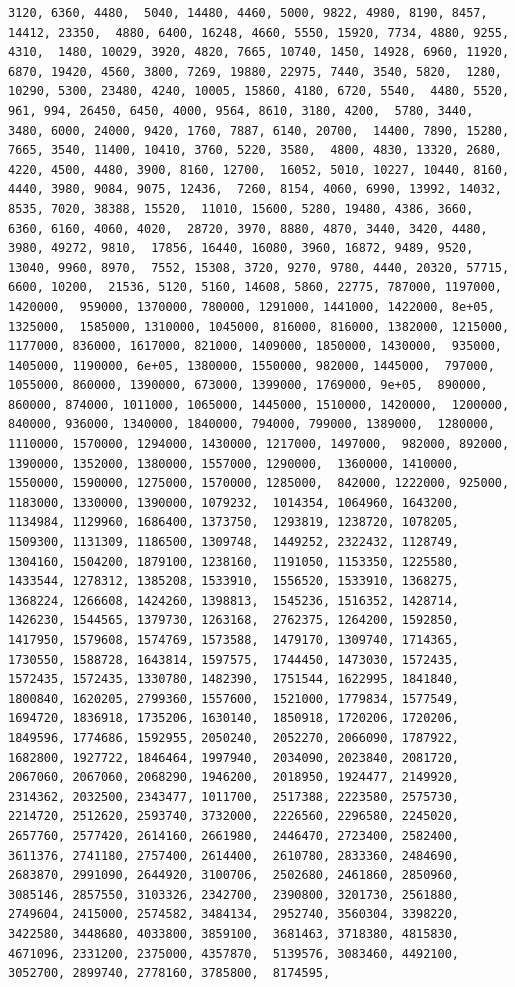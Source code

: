 \documentclass[
]{article}
\begin{document}
\begin{verbatim}
3120, 6360, 4480,  5040, 14480, 4460, 5000, 9822, 4980, 8190, 8457, 14412, 23350,  4880, 6400, 16248, 4660, 5550, 15920, 7734, 4880, 9255, 4310,  1480, 10029, 3920, 4820, 7665, 10740, 1450, 14928, 6960, 11920,  6870, 19420, 4560, 3800, 7269, 19880, 22975, 7440, 3540, 5820,  1280, 10290, 5300, 23480, 4240, 10005, 15860, 4180, 6720, 5540,  4480, 5520, 961, 994, 26450, 6450, 4000, 9564, 8610, 3180, 4200,  5780, 3440, 3480, 6000, 24000, 9420, 1760, 7887, 6140, 20700,  14400, 7890, 15280, 7665, 3540, 11400, 10410, 3760, 5220, 3580,  4800, 4830, 13320, 2680, 4220, 4500, 4480, 3900, 8160, 12700,  16052, 5010, 10227, 10440, 8160, 4440, 3980, 9084, 9075, 12436,  7260, 8154, 4060, 6990, 13992, 14032, 8535, 7020, 38388, 15520,  11010, 15600, 5280, 19480, 4386, 3660, 6360, 6160, 4060, 4020,  28720, 3970, 8880, 4870, 3440, 3420, 4480, 3980, 49272, 9810,  17856, 16440, 16080, 3960, 16872, 9489, 9520, 13040, 9960, 8970,  7552, 15308, 3720, 9270, 9780, 4440, 20320, 57715, 6600, 10200,  21536, 5120, 5160, 14608, 5860, 22775, 787000, 1197000, 1420000,  959000, 1370000, 780000, 1291000, 1441000, 1422000, 8e+05, 1325000,  1585000, 1310000, 1045000, 816000, 816000, 1382000, 1215000,  1177000, 836000, 1617000, 821000, 1409000, 1850000, 1430000,  935000, 1405000, 1190000, 6e+05, 1380000, 1550000, 982000, 1445000,  797000, 1055000, 860000, 1390000, 673000, 1399000, 1769000, 9e+05,  890000, 860000, 874000, 1011000, 1065000, 1445000, 1510000, 1420000,  1200000, 840000, 936000, 1340000, 1840000, 794000, 799000, 1389000,  1280000, 1110000, 1570000, 1294000, 1430000, 1217000, 1497000,  982000, 892000, 1390000, 1352000, 1380000, 1557000, 1290000,  1360000, 1410000, 1550000, 1590000, 1275000, 1570000, 1285000,  842000, 1222000, 925000, 1183000, 1330000, 1390000, 1079232,  1014354, 1064960, 1643200, 1134984, 1129960, 1686400, 1373750,  1293819, 1238720, 1078205, 1509300, 1131309, 1186500, 1309748,  1449252, 2322432, 1128749, 1304160, 1504200, 1879100, 1238160,  1191050, 1153350, 1225580, 1433544, 1278312, 1385208, 1533910,  1556520, 1533910, 1368275, 1368224, 1266608, 1424260, 1398813,  1545236, 1516352, 1428714, 1426230, 1544565, 1379730, 1263168,  2762375, 1264200, 1592850, 1417950, 1579608, 1574769, 1573588,  1479170, 1309740, 1714365, 1730550, 1588728, 1643814, 1597575,  1744450, 1473030, 1572435, 1572435, 1572435, 1330780, 1482390,  1751544, 1622995, 1841840, 1800840, 1620205, 2799360, 1557600,  1521000, 1779834, 1577549, 1694720, 1836918, 1735206, 1630140,  1850918, 1720206, 1720206, 1849596, 1774686, 1592955, 2050240,  2052270, 2066090, 1787922, 1682800, 1927722, 1846464, 1997940,  2034090, 2023840, 2081720, 2067060, 2067060, 2068290, 1946200,  2018950, 1924477, 2149920, 2314362, 2032500, 2343477, 1011700,  2517388, 2223580, 2575730, 2214720, 2512620, 2593740, 3732000,  2226560, 2296580, 2245020, 2657760, 2577420, 2614160, 2661980,  2446470, 2723400, 2582400, 3611376, 2741180, 2757400, 2614400,  2610780, 2833360, 2484690, 2683870, 2991090, 2644920, 3100706,  2502680, 2461860, 2850960, 3085146, 2857550, 3103326, 2342700,  2390800, 3201730, 2561880, 2749604, 2415000, 2574582, 3484134,  2952740, 3560304, 3398220, 3422580, 3448680, 4033800, 3859100,  3681463, 3718380, 4815830, 4671096, 2331200, 2375000, 4357870,  5139576, 3083460, 4492100, 3052700, 2899740, 2778160, 3785800,  8174595, 
\end{verbatim}
\end{document}
